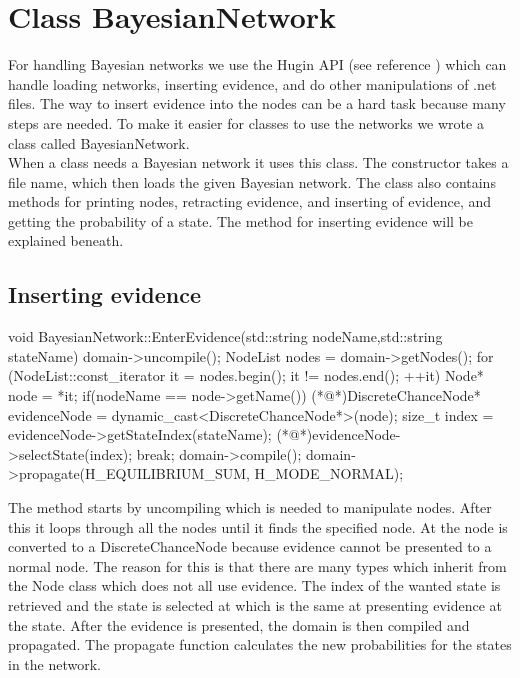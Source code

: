 \section{Class BayesianNetwork}
	For handling Bayesian networks we use the Hugin API (see reference \cite{hugin_api}) which can handle loading networks, inserting evidence, and do other manipulations of .net files. The way to insert evidence into the nodes can be a hard task because many steps are needed. To make it easier for classes to use the networks we wrote a class called BayesianNetwork.\\

	When a class needs a Bayesian network it uses this class. The constructor takes a file name, which then loads the given 
	Bayesian network. The class also contains methods for printing nodes, retracting evidence, and inserting of evidence, and getting the probability of a state. 
	The method for inserting evidence will be explained beneath.
	\subsection*{Inserting evidence}
		\begin{Sourcecode}[caption=EnterEvidence method]
void BayesianNetwork::EnterEvidence(std::string nodeName,std::string stateName){
domain->uncompile();
NodeList nodes = domain->getNodes();
for (NodeList::const_iterator it = nodes.begin(); it != nodes.end(); ++it)
{
	Node* node = *it;
	if(nodeName == node->getName())
	{
		(*@\lnote@*)DiscreteChanceNode* evidenceNode = dynamic_cast<DiscreteChanceNode*>(node);
		size_t index = evidenceNode->getStateIndex(stateName);
		(*@\lnote@*)evidenceNode->selectState(index);
		break;
	}
}
domain->compile();
domain->propagate(H_EQUILIBRIUM_SUM, H_MODE_NORMAL);
}
		\end{Sourcecode}
		The method starts by uncompiling which is needed to manipulate nodes. After this it loops through all the nodes until it finds the specified 
		node. At  the node is converted to a DiscreteChanceNode because evidence cannot be presented to a normal node. The reason for this 
		is that there are many types which inherit from the Node class which does not all use evidence. The index of the wanted state is retrieved and the state is selected at  which is the same at presenting evidence at the state. After the evidence is presented, the 
		domain is then compiled and propagated. The propagate function calculates the new probabilities for the states in the network.